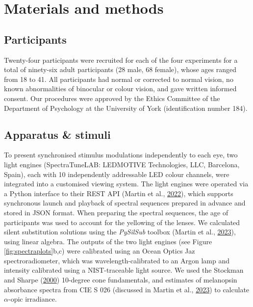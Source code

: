 \documentclass[
]{article}
\begin{document}
\hypertarget{materials-and-methods}{%
\section{Materials and methods}\label{materials-and-methods}}

\hypertarget{participants}{%
\subsection{Participants}\label{participants}}

Twenty-four participants were recruited for each of the four experiments for a total of ninety-six adult participants (28 male, 68 female), whose ages ranged from 18 to 41. All participants had normal or corrected to normal vision, no known abnormalities of binocular or colour vision, and gave written informed consent. Our procedures were approved by the Ethics Committee of the Department of Psychology at the University of York (identification number 184).

\hypertarget{apparatus-stimuli}{%
\subsection{Apparatus \& stimuli}\label{apparatus-stimuli}}

To present synchronised stimulus modulations independently to each eye, two light engines (SpectraTuneLAB: LEDMOTIVE Technologies, LLC, Barcelona, Spain), each with 10 independently addressable LED colour channels, were integrated into a customised viewing system. The light engines were operated via a Python interface to their REST API (Martin et al., \protect\hyperlink{ref-Martin2022}{2022}), which supports synchronous launch and playback of spectral sequences prepared in advance and stored in JSON format. When preparing the spectral sequences, the age of participants was used to account for the yellowing of the lenses. We calculated silent substitution solutions using the \emph{PySilSub} toolbox (Martin et al., \protect\hyperlink{ref-Martin2023}{2023}), using linear algebra. The outputs of the two light engines (see Figure \ref{fig:spectraplots}b,c) were calibrated using an Ocean Optics Jaz spectroradiometer, which was wavelength-calibrated to an Argon lamp and intensity calibrated using a NIST-traceable light source. We used the Stockman and Sharpe (\protect\hyperlink{ref-Stockman2000}{2000}) 10-degree cone fundamentals, and estimates of melanopsin absorbance spectra from CIE S 026 (discussed in Martin et al., \protect\hyperlink{ref-Martin2023}{2023}) to calculate \(\alpha\)-opic irradiance.
\end{document}

